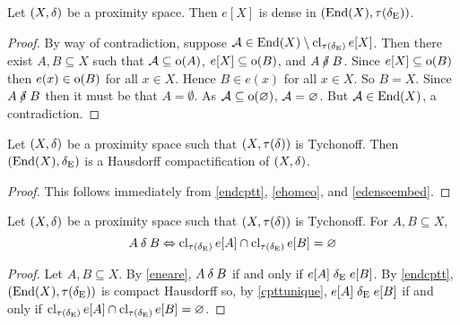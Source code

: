 \begin{lemma}
	\label{edenseembed}
	Let \( (X,\mathord{\delta}) \) be a proximity space.  Then \( e[X] \) is dense in \( (\operatorname{End}(X),\tau(\mathord{\delta}_\text{E})) \).
\end{lemma}
\begin{proof}	
	By way of contradiction, suppose \( \mathcal{A} \in \operatorname{End}(X) \setminus \operatorname{cl}_{\tau(\mathord{\delta}_\text{E})} e[X] \).  Then there exist \( A,B \subseteq X \) such that \( \mathcal{A} \subseteq \operatorname{o}(A) \), \( e[X] \subseteq \operatorname{o}(B) \), and \( A \nnear B \).  Since \( e[X] \subseteq \operatorname{o}(B) \) then \( e(x) \in \operatorname{o}(B) \) for all \( x \in X \).  Hence \( B \in e(x) \) for all \( x \in X \).  So \( B = X \).  Since \( A \nnear B \) then it must be that \( A = \emptyset \).  As \( \mathcal{A} \subseteq \operatorname{o}(\varnothing) \), \( \mathcal{A} = \varnothing \).  But \( \mathcal{A} \in \operatorname{End}(X) \), a contradiction.
\end{proof}

\begin{theorem}
	Let \( (X,\mathord{\delta}) \) be a proximity space such that \( (X,\tau(\mathord{\delta})) \) is Tychonoff.  Then \( (\operatorname{End}(X),\mathrel{\delta_\text{E}}) \) is a Hausdorff compactification of \( (X,\mathord{\delta}) \).
\end{theorem}
\begin{proof}
	This follows immediately from \ref{endcptt}, \ref{ehomeo}, and \ref{edenseembed}.
\end{proof}

\begin{corollary}
	Let \( (X,\mathord{\delta}) \) be a proximity space such that \( (X,\tau(\mathord{\delta})) \) is Tychonoff.  For \( A,B \subseteq X \),
	\[ A \mathbin{\delta} B \Leftrightarrow \operatorname{cl}_{\tau(\mathrel{\delta_\text{E}})} e[A] \cap \operatorname{cl}_{\tau(\mathrel{\delta_\text{E}})} e[B] = \varnothing \]
\end{corollary}
\begin{proof}
	Let \( A,B \subseteq X \).  By \ref{eneare}, \( A \mathbin{\delta} B \) if and only if \( e[A] \mathrel{\delta_\text{E}} e[B] \).  By \ref{endcptt}, \( (\operatorname{End}(X),\tau(\mathrel{\delta_\text{E}})) \) is compact Hausdorff so, by \ref{cpttunique}, \( e[A] \mathrel{\delta_\text{E}} e[B] \) if and only if \( \operatorname{cl}_{\tau(\mathrel{\delta_\text{E}})} e[A] \cap \operatorname{cl}_{\tau(\mathrel{\delta_\text{E}})} e[B] = \varnothing \).
\end{proof}

